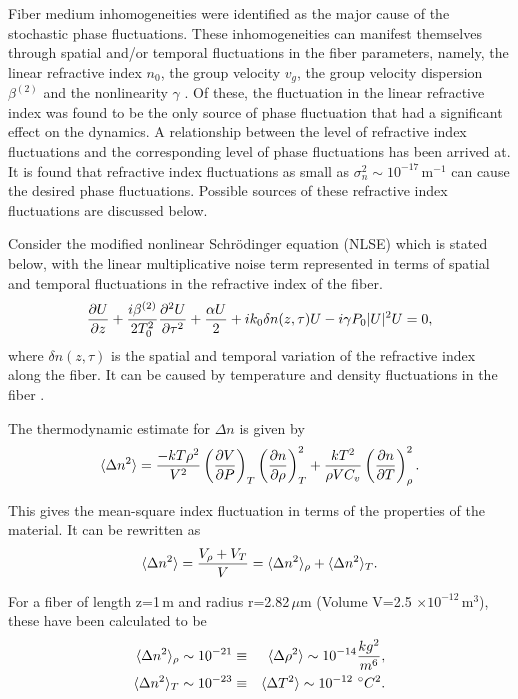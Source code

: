 Fiber medium inhomogeneities were identified as the major cause of the
stochastic phase fluctuations. These inhomogeneities can manifest themselves
through spatial and/or temporal fluctuations in the fiber parameters, namely,
the linear refractive index $n_0$, the group velocity $v_g$, the group
velocity dispersion $\beta^{(2)}$ and the nonlinearity
$\gamma$ \cite{abdullaev}. Of these, the fluctuation in the linear refractive
index was found to be the only source of phase fluctuation that had a
significant effect on the dynamics. A relationship between the level of
refractive index fluctuations and the  corresponding level of phase
fluctuations has been arrived at. It is found that refractive index
fluctuations as small as $\sigma_n^2 \sim 10^{-17}$\,m$^{-1}$ can cause the
desired phase fluctuations. Possible sources of these refractive index
fluctuations are discussed below.

Consider the modified nonlinear Schr\"odinger equation (NLSE) which is
stated below, with the linear multiplicative noise term represented in terms of
spatial and temporal fluctuations in the refractive index of the fiber.
\begin{equation}
{\partial U \over \partial z} + {i\beta^{(2)} \over 2T_0^2} {\partial^2U \over \partial\tau^2} + {\alpha U \over 2} + ik_0 \delta n(z,\tau)U - i\gamma P_{0}|U|^2 U = 0 ,
\end{equation}
where $\delta n(z,\tau)$ is the spatial and temporal variation of the refractive
index along the fiber. It can be caused by temperature and density
fluctuations in the fiber \cite{glenn}.

The thermodynamic estimate for $\Delta n$ is given by \cite{glenn}
\begin{equation}
\langle \Delta n^{2} \rangle = {-kT\rho^2 \over V^2}
\left( {\partial V \over \partial P} \right)_{T}
\left( {\partial n \over \partial \rho} \right)_{T}^{2}
 + {kT^2 \over \rho VC_v} \left( {\partial n \over \partial T} \right)_{\rho}^2 .
\end{equation}

This gives the mean-square index fluctuation in terms of the properties of
the material. It can be rewritten as
\begin{equation}
\langle \Delta n^{2} \rangle = {V_{\rho}+V_T \over V} = \langle \Delta n^{2} \rangle_{\rho}+\langle \Delta n^{2} \rangle_{T} .
\end{equation}

For a fiber of length z=1\,m and radius r=2.82\,$\mu$m
(Volume V=2.5 $\times 10^{-12}$\,m$^3$), these have been calculated to be
\begin{eqnarray}
\langle \Delta n^2 \rangle_{\rho} \sim 10^{-21} & \equiv & \langle \Delta \rho^2 \rangle \sim 10^{-14}
{kg^2 \over m^6}, \nonumber \\
\langle \Delta n^2 \rangle_T \sim 10^{-23} & \equiv & \langle \Delta T^2 \rangle \sim 10^{-12}~{^\circ}C^2 .
\end{eqnarray}

